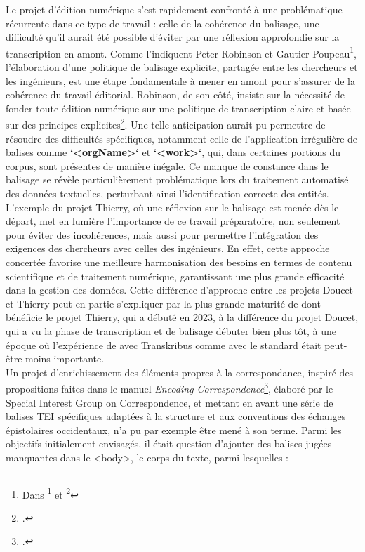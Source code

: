 Le projet d’édition numérique \pense s’est rapidement confronté à une problématique récurrente dans ce type de travail : celle de la cohérence du balisage, une difficulté qu’il aurait été possible d’éviter par une réflexion approfondie sur la transcription en amont. Comme l’indiquent Peter Robinson et Gautier Poupeau\footnote{Dans \footcite{poupeau_reflexions_2004} et \footcite{poupeau_ledition_2008}}, l’élaboration d’une politique de balisage explicite, partagée entre les chercheurs et les ingénieurs, est une étape fondamentale à mener en amont pour s’assurer de la cohérence du travail éditorial. Robinson, de son côté, insiste sur la nécessité de fonder toute édition numérique sur une politique de transcription claire et basée sur des principes explicites\footcite{blanc_feracci_quest-ce_2022}. 
Une telle anticipation aurait pu permettre de résoudre des difficultés spécifiques, notamment celle de l’application irrégulière de balises comme \textbf{`<orgName>`} et \textbf{`<work>`}, qui, dans certaines portions du corpus, sont présentes de manière inégale. Ce manque de constance dans le balisage se révèle particulièrement problématique lors du traitement automatisé des données textuelles, perturbant ainsi l’identification correcte des entités.
L’exemple du projet Thierry, où une réflexion sur le balisage est menée dès le départ, met en lumière l’importance de ce travail préparatoire, non seulement pour éviter des incohérences, mais aussi pour permettre l’intégration des exigences des chercheurs avec celles des ingénieurs. En effet, cette approche concertée favorise une meilleure harmonisation des besoins en termes de contenu scientifique et de traitement numérique, garantissant une plus grande efficacité dans la gestion des données. Cette différence d’approche entre les projets Doucet et Thierry peut en partie s’expliquer par la plus grande maturité de \pense dont bénéficie le projet Thierry, qui a débuté en 2023, à la différence du projet Doucet, qui a vu la phase de transcription et de balisage débuter bien plus tôt, à une époque où l’expérience de \pense avec Transkribus comme avec le standard \tei était peut-être moins importante.
\newline
{}\\

Un projet d’enrichissement des éléments propres à la correspondance, inspiré des propositions faites dans le manuel \textit{Encoding Correspondence}\footcite{dumont_encoding_2019}, élaboré par le \tei Special Interest Group on Correspondence, et mettant en avant une série de balises TEI spécifiques adaptées à la structure et aux conventions des échanges épistolaires occidentaux, n’a pu par exemple être mené à son terme. Parmi les objectifs initialement envisagés, il était question d’ajouter des balises jugées manquantes dans le <body>, le corps du texte, parmi lesquelles : 

